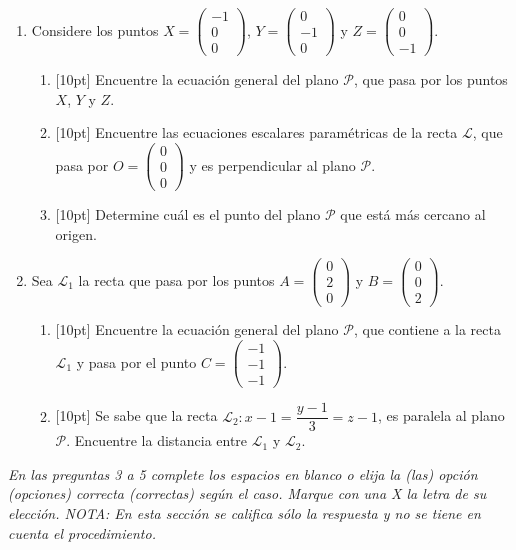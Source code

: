 \documentclass[11pt]{article}
\newcommand{\vectiii}[3]{\begin{pmatrix}#1\\#2\\#3\end{pmatrix}}
\newcommand{\nota}[1]{{\small\itshape\color{unalblue!70!black} #1}}
\begin{document}
\begin{enumerate}
\item Considere los puntos $X=\vectiii{-1}{0}{0}$, $Y=\vectiii{0}{-1}{0}$ y $Z=\vectiii{0}{0}{-1}$.

\begin{enumerate}[label=(\alph*)]
\item{}[10pt] Encuentre la ecuación general del plano $\mathcal{P}$, que pasa por los puntos $X$, $Y$ y $Z$.
\item{}[10pt] Encuentre las ecuaciones escalares paramétricas de la recta $\mathcal{L}$, que pasa por $O=\vectiii{0}{0}{0}$ y es perpendicular al plano $\mathcal{P}$.
\item{}[10pt] Determine cuál es el punto del plano $\mathcal{P}$ que está más cercano al origen.
\end{enumerate}

\item Sea $\mathcal{L}_1$ la recta que pasa por los puntos $A=\vectiii{0}{2}{0}$ y $B=\vectiii{0}{0}{2}$.

\begin{enumerate}[label=(\alph*)]
\item{}[10pt] Encuentre la ecuación general del plano $\mathcal{P}$, que contiene a la recta $\mathcal{L}_1$ y pasa por el punto $C=\vectiii{-1}{-1}{-1}$.
\item{}[10pt] Se sabe que la recta $\mathcal{L}_2: x-1=\dfrac{y-1}{3}=z-1$, es paralela al plano $\mathcal{P}$. Encuentre la distancia entre $\mathcal{L}_1$ y $\mathcal{L}_2$.
\end{enumerate}
\end{enumerate}

\vspace{6pt}
\nota{En las preguntas 3 a 5 complete los espacios en blanco o elija la (las) opción (opciones) correcta (correctas) según el caso. Marque con una X la letra de su elección. NOTA: En esta sección se califica sólo la respuesta y no se tiene en cuenta el procedimiento.}
\end{document}
